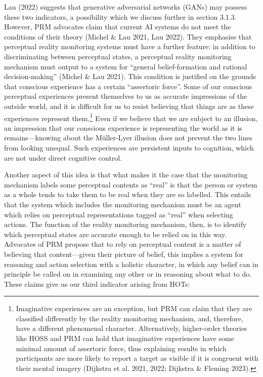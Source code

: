 \documentclass[12pt]{article}
\begin{document}
Lau (2022) suggests that generative adversarial networks (GANs) may possess these two indicators, a possibility which we discuss further in section 3.1.3. However, PRM advocates claim that current AI systems do not meet the conditions of their theory (Michel \& Lau 2021, Lau 2022). They emphasise that perceptual reality monitoring systems must have a further feature: in addition to discriminating between perceptual states, a perceptual reality monitoring mechanism must output to a system for ``general belief-formation and rational decision-making'' (Michel \& Lau 2021). This condition is justified on the grounds that conscious experience has a certain ``assertoric force''. Some of our conscious perceptual experiences present themselves to us as accurate impressions of the outside world, and it is difficult for us to resist believing that things are as these experiences represent them.\footnote{Imaginative experiences are an exception, but PRM can claim that they are classified differently by the reality monitoring mechanism, and, therefore, have a different phenomenal character. Alternatively, higher-order theories like HOSS and PRM can hold that imaginative experiences have some minimal amount of assertoric force, thus explaining results in which participants are more likely to report a target as visible if it is congruent with their mental imagery (Dijkstra et al. 2021, 2022; Dijkstra \& Fleming 2023).} Even if we believe that we are subject to an illusion, an impression that our conscious experience is representing the world as it is remains—knowing about the Müller-Lyer illusion does not prevent the two lines from looking unequal. Such experiences are persistent inputs to cognition, which are not under direct cognitive control.

Another aspect of this idea is that what makes it the case that the monitoring mechanism labels some perceptual contents as ``real'' is that the person or system as a whole tends to take them to be real when they are so labelled. This entails that the system which includes the monitoring mechanism must be an agent which relies on perceptual representations tagged as ``real'' when selecting actions. The function of the reality monitoring mechanism, then, is to identify which perceptual states are accurate enough to be relied on in this way. Advocates of PRM propose that to rely on perceptual content is a matter of believing that content—given their picture of belief, this implies a system for reasoning and action selection with a holistic character, in which any belief can in principle be called on in examining any other or in reasoning about what to do. These claims give us our third indicator arising from HOTs:
\end{document}
